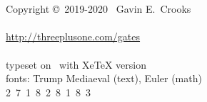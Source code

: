 \documentclass[article,pagebackref]{bespoke5}
\begin{document}
\appendix














\printendnotes




\vfill
{\center
~\\~\\
Copyright \copyright~2019-2020~ Gavin E.\ Crooks~\\
~ %
\\
\url{http://threeplusone.com/gates} 
\\
~
\\
typeset on \isotoday~with XeTeX version \the\XeTeXversion\XeTeXrevision
\\
fonts: Trump Mediaeval (text), Euler (math)
\\
2~7~1~8~2~8~1~8~3
\\
~ 
\\
}


 
\end{document}
